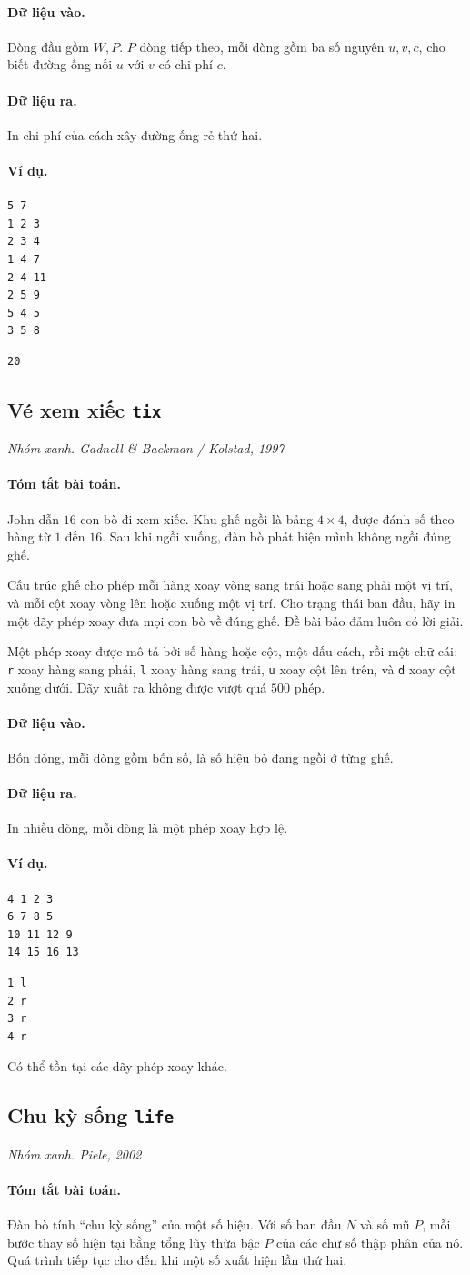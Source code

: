 \documentclass[11pt]{article}
\newcommand{\problem}[4]{%
  \subsection[#1 (#2)]{#1 \hfill {\normalsize\texttt{#2}}}%
  \noindent\textit{#3. #4}\par\smallskip
}
\newcommand{\iosec}[1]{\paragraph{#1}}
\begin{document}
\iosec{Dữ liệu vào.}
Dòng đầu gồm \(W,P\). \(P\) dòng tiếp theo, mỗi dòng gồm ba số nguyên \(u,v,c\),
cho biết đường ống nối \(u\) với \(v\) có chi phí \(c\).

\iosec{Dữ liệu ra.}
In chi phí của cách xây đường ống rẻ thứ hai.

\iosec{Ví dụ.}
\begin{verbatim}
5 7
1 2 3
2 3 4
1 4 7
2 4 11
2 5 9
5 4 5
3 5 8
\end{verbatim}

\begin{verbatim}
20
\end{verbatim}

\problem{Vé xem xiếc}{tix}{Nhóm xanh}{Gadnell \& Backman / Kolstad, 1997}

\iosec{Tóm tắt bài toán.}
John dẫn \(16\) con bò đi xem xiếc. Khu ghế ngồi là bảng \(4\times 4\), được
đánh số theo hàng từ \(1\) đến \(16\). Sau khi ngồi xuống, đàn bò phát hiện
mình không ngồi đúng ghế.

Cấu trúc ghế cho phép mỗi hàng xoay vòng sang trái hoặc sang phải một vị trí,
và mỗi cột xoay vòng lên hoặc xuống một vị trí. Cho trạng thái ban đầu, hãy
in một dãy phép xoay đưa mọi con bò về đúng ghế. Đề bài bảo đảm luôn có lời
giải.

Một phép xoay được mô tả bởi số hàng hoặc cột, một dấu cách, rồi một chữ cái:
\texttt{r} xoay hàng sang phải, \texttt{l} xoay hàng sang trái, \texttt{u}
xoay cột lên trên, và \texttt{d} xoay cột xuống dưới. Dãy xuất ra không được
vượt quá \(500\) phép.

\iosec{Dữ liệu vào.}
Bốn dòng, mỗi dòng gồm bốn số, là số hiệu bò đang ngồi ở từng ghế.

\iosec{Dữ liệu ra.}
In nhiều dòng, mỗi dòng là một phép xoay hợp lệ.

\iosec{Ví dụ.}
\begin{verbatim}
4 1 2 3
6 7 8 5
10 11 12 9
14 15 16 13
\end{verbatim}

\begin{verbatim}
1 l
2 r
3 r
4 r
\end{verbatim}

Có thể tồn tại các dãy phép xoay khác.

\problem{Chu kỳ sống}{life}{Nhóm xanh}{Piele, 2002}

\iosec{Tóm tắt bài toán.}
Đàn bò tính ``chu kỳ sống'' của một số hiệu. Với số ban đầu \(N\) và số mũ
\(P\), mỗi bước thay số hiện tại bằng tổng lũy thừa bậc \(P\) của các chữ số
thập phân của nó. Quá trình tiếp tục cho đến khi một số xuất hiện lần thứ hai.
\end{document}
